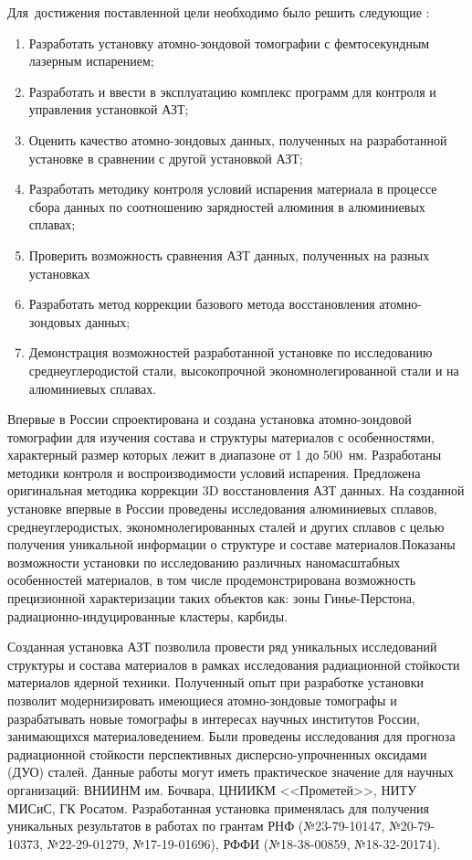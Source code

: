 Для~достижения поставленной цели необходимо было решить следующие {\tasks}:
\begin{enumerate}[beginpenalty=10000]
  \item Разработать установку атомно-зондовой томографии с фемтосекундным лазерным испарением;
  \item Разработать и ввести в эксплуатацию комплекс программ для контроля и управления установкой АЗТ;
  \item Оценить качество атомно-зондовых данных, полученных на разработанной установке в сравнении с другой установкой АЗТ;
  \item Разработать методику контроля условий испарения материала в процессе сбора данных по соотношению зарядностей алюминия в алюминиевых сплавах;
  \item Проверить возможность сравнения АЗТ данных, полученных на разных установках
  \item Разработать метод коррекции базового метода восстановления атомно-зондовых данных;
  \item Демонстрация возможностей разработанной установке по исследованию среднеуглеродистой стали, высокопрочной экономнолегированной стали и на алюминиевых сплавах.
\end{enumerate}


{\novelty}
Впервые в России спроектирована и создана установка атомно-зондовой томографии для изучения состава и структуры материалов с особенностями, характерный размер которых лежит в диапазоне от 1 до 500~нм. Разработаны методики контроля и воспроизводимости условий испарения. Предложена оригинальная методика коррекции 3D восстановления АЗТ данных. На созданной установке впервые в России проведены исследования алюминиевых сплавов, среднеуглеродистых, экономнолегированных сталей и других сплавов с целью получения уникальной информации о структуре и составе материалов.Показаны возможности установки по исследованию различных наномасштабных особенностей материалов, в том числе продемонстрирована возможность прецизионной характеризации таких объектов как: зоны Гинье-Перстона, радиационно-индуцированные кластеры, карбиды.

{\influence} Созданная установка АЗТ позволила провести ряд уникальных исследований структуры и состава материалов в рамках исследования радиационной стойкости материалов ядерной техники. Полученный опыт при разработке установки позволит модернизировать имеющиеся атомно-зондовые томографы и разрабатывать новые томографы в интересах научных институтов России, занимающихся материаловедением. Были проведены исследования для прогноза радиационной стойкости перспективных дисперсно-упрочненных оксидами (ДУО) сталей. Данные работы могут иметь практическое значение для научных организаций: ВНИИНМ им. Бочвара, ЦНИИКМ <<Прометей>>, НИТУ МИСиС, ГК Росатом. Разработанная установка применялась для получения уникальных результатов в работах по грантам РНФ (№23-79-10147, №20-79-10373, №22-29-01279, №17-19-01696), РФФИ (№18-38-00859, №18-32-20174).

